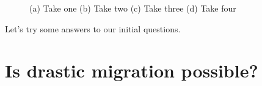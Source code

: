 \documentclass[doc,12pt,floatsintext]{apa7}
\begin{document}
\begin{figure}[h]
    \centering
    \caption{(a) Take one (b) Take two (c) Take three  (d) Take four}
    \label{esc}
\end{figure}

Let's try some answers to our initial questions.

\section {Is drastic migration possible?}
\end{document}
